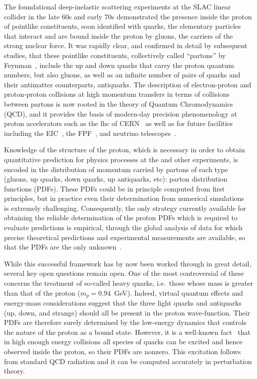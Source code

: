 
The foundational deep-inelastic scattering experiments at the SLAC linear collider
in the late 60s and early 70s demonstrated the presence inside the
proton of pointlike  constituents, soon identified with quarks, the
elementary particles that interact and are bound inside the proton by
gluons, the carriers of the strong  nuclear force.
%
It was rapidly clear, and confirmed in detail by subsequent studies,
that these pointlike constituents, collectively called ``partons'' by
Feynman~\cite{Feynman:1969wa}, include the up and down quarks that
carry the proton quantum numbers, but also gluons, as well
as an infinite number of pairs of quarks and their
antimatter counterparts, antiquarks.
%
The description of electron-proton and proton-proton collisions at high
momentum transfers in terms of collisions between partons is now
rooted in the theory of Quantum  Chromodynamics (QCD), and it provides
the basis
of modern-day precision phenomenology at proton accelerators such as
the \acrfull{lhc} of CERN~\cite{Gao:2017yyd} as well
as for future facilities including the
EIC~\cite{AbdulKhalek:2021gbh},
the FPF~\cite{Feng:2022inv},
and  
neutrino telescopes~\cite{IceCube-Gen2:2020qha}.

Knowledge of the structure of the proton, which is necessary in order
to obtain
quantitative prediction for physics processes at the \lhc and other
experiments, is encoded in
the distribution of  momentum carried by partons of each type
(gluons, up quarks, down quarks, up antiquarks, etc):
parton distribution functions (PDFs).
%
These PDFs could be in principle
computed from first principles, but in
practice even their determination from numerical
simulations~\cite{Constantinou:2020hdm} is extremely challenging.
%
Consequently,  the only 
strategy currently available for obtaining the
reliable determination of the proton PDFs which is required to evaluate \lhc
predictions is empirical, through the global analysis of
data for which precise theoretical predictions and experimental
measurements are available, so that the PDFs are the only
unknown~\cite{Gao:2017yyd}.

While this successful framework has by now been worked through in great detail, several key open questions remain open.
%
One of the most controversial of these concerns the treatment of
so-called heavy quarks, i.e.\ those whose mass is greater than that of
the proton ($m_p=0.94$~GeV). Indeed, virtual quantum effects and
energy-mass considerations suggest that the three light quarks and
antiquarks (up, 
down, and strange) should all be present in the proton
wave-function.
%
Their PDFs are therefore surely determined by the low-energy
dynamics that controls the nature of the proton as a bound
state.
%
However, it is a well-known fact~\cite{DeRoeck:2011na,
  Kovarik:2019xvh,Gao:2017yyd,Rojo:2019uip}
that in high enough energy collisions all species of quarks can be
excited and hence observed
inside the proton, so their PDFs are nonzero.
%
This excitation
follows from standard QCD radiation and it can be computed accurately
in perturbation theory.


